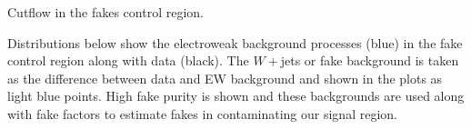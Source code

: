 \begin{table}[h!]
\scalebox{0.6}{

}
\caption{Cutflow in the fakes control region.}
\label{tab:fakescr}
\end{table}

Distributions below show the electroweak background processes (blue) in the fake control region along with data (black). The $W+$jets or fake background is taken as the difference between data and EW background and shown in the plots as light blue points. High fake purity is shown and these backgrounds are used along with fake factors to estimate fakes in contaminating our signal region.

\begin{figure}[!h]
  \hfill
  \hfill
  \hfill
\end{figure}
